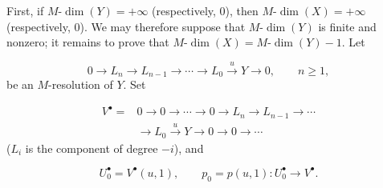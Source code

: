 First, if $M\text{-}\dim(Y)=+\infty$ (respectively, $0$), then
$M\text{-}\dim(X)=+\infty$ (respectively, $0$). We may therefore suppose
that $M\text{-}\dim(Y)$ is finite and nonzero; it remains to prove that
$M\text{-}\dim(X)=M\text{-}\dim(Y)-1$. Let

\[
0\longrightarrow L_n\longrightarrow L_{n-1}\longrightarrow\cdots
\longrightarrow L_0\xrightarrow{u}Y\longrightarrow0,
\qquad n\geq1,
\]
be an $M$-resolution of $Y$. Set

\[
\begin{aligned}
V^\bullet={}&0\longrightarrow0\longrightarrow\cdots\longrightarrow0
\longrightarrow L_n\longrightarrow L_{n-1}\longrightarrow\cdots\\
&\longrightarrow L_0\xrightarrow{u}Y\longrightarrow0
\longrightarrow0\longrightarrow\cdots
\end{aligned}
\]
($L_i$ is the component of degree $-i$), and

\[
U_0^\bullet=V^\bullet(u,1),
\qquad
p_0=p(u,1)\colon U_0^\bullet\longrightarrow V^\bullet.
\]
\endgroup
